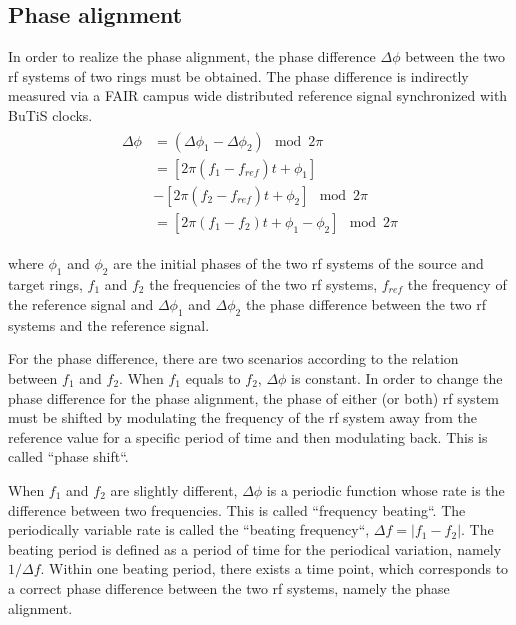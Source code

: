 \subsection{Phase alignment}
In order to realize the phase alignment, the phase difference $\Delta \phi$ between the two rf systems of two rings must be obtained. The phase difference is indirectly measured via a FAIR campus wide distributed reference signal synchronized with BuTiS clocks. 
\begin{eqnarray}
\begin{aligned}
	\Delta \phi&=(\Delta \phi_1-\Delta \phi_2) \mod 2\pi\\
&=[2\pi(f_1-f_\mathit{ref})t+\phi_1]\\
&-[2\pi(f_2-f_\mathit{ref})t+\phi_2] \mod 2\pi \\
&=[2\pi(f_1-f_2)t+\phi_1-\phi_2] \mod 2\pi
\end{aligned}
\end{eqnarray}

where $\phi_1$ and $\phi_2$ are the initial phases of the two rf systems of the source and target rings, $f_1$ and $f_2$ the frequencies of the two rf systems, $f_\mathit{ref}$ the frequency of the reference signal and $\Delta \phi_1$ and $\Delta \phi_2$ the phase difference between the two rf systems and the reference signal. 

For the phase difference, there are two scenarios according to the relation between $f_1$ and $f_2$. When $f_1$ equals to $f_2$, $\Delta \phi$ is constant. In order to change the phase difference for the phase alignment, the phase of either (or both) rf system must be shifted by modulating the frequency of the rf system away from the reference value for a specific period of time and then modulating back. This is called ``phase shift``.

When $f_1$ and $f_2$ are slightly different, $\Delta \phi$ is a periodic function whose rate is the difference between two frequencies. This is called ``frequency beating``. The periodically variable rate is called the ``beating frequency``, $\Delta f=|f_1-f_2|$. The beating period is defined as a period of time for the periodical variation, namely $1/\Delta f$. Within one beating period, there exists a time point, which corresponds to a correct phase difference between the two rf systems, namely the phase alignment. 

